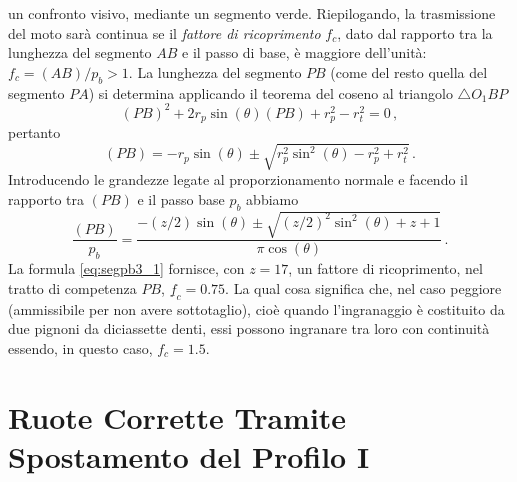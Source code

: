 un confronto visivo, mediante un segmento verde.
Riepilogando, la trasmissione del moto sar\`a continua se il 
{\em fattore di ricoprimento} $f_c$, dato
dal rapporto tra la lunghezza del segmento $AB$ e il passo di base, \`e
maggiore dell'unit\`a: $f_c=(AB)/p_b>1$.
 La lunghezza del segmento $PB$ (come del resto quella del segmento
$PA$) si determina applicando il teorema del coseno al triangolo $\triangle
{O_1BP}$ 
\begin{equation}
(PB)^2  +2r_p\sin( \theta)(PB)+r_p^2 - r_t^2=0\,,
\label{eq:segpb2}
\end{equation}
\noindent pertanto
\begin{equation}
(PB)= -r_p\sin( \theta)\pm \sqrt{r_p^2\sin^2(\theta)-r_p^2 + r_t^2}\,.
\label{eq:segpb3}
\end{equation}
\noindent Introducendo le grandezze legate al proporzionamento normale 
e facendo il rapporto tra $(PB)$ e il passo base $p_b$ abbiamo
\begin{equation}
\frac{(PB)}{p_b}= \frac{-(z/2)\sin( \theta)\pm \sqrt{(z/2)^2\sin^2(\theta)+ z+1}}{\pi \cos (\theta)}\,.
\label{eq:segpb3_1}
\end{equation}
\noindent La formula \ref{eq:segpb3_1} fornisce,
con  $z=17$, un fattore di ricoprimento,
nel tratto di competenza $PB$, $\underline f_c=0.75$. La qual cosa  significa
che, nel caso peggiore (ammissibile per non avere sottotaglio),
cio\`e quando l'ingranaggio \`e costituito da due pignoni da diciassette denti,
essi possono ingranare tra loro con continuit\`a essendo, in questo caso,
$f_c=1.5$.

\section{Ruote Corrette Tramite Spostamento del Profilo I} \label{ruote-corr1}

